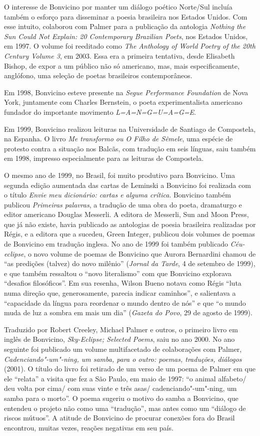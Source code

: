 O interesse de Bonvicino por manter um diálogo poético Norte/Sul incluía
também o esforço para disseminar a poesia brasileira nos Estados Unidos.
Com esse intuito, colaborou com Palmer para a publicação da antologia
\emph{Nothing the Sun Could Not Explain: 20 Contemporary Brazilian
Poets}, nos Estados Unidos, em 1997. O volume foi reeditado como
\emph{The  Anthology of World Poetry of the 20th Century Volume 3},
em 2003. Essa era a primeira tentativa, desde Elisabeth Bishop, de expor
a um público não só americano, mas, mais especificamente, anglófono, uma
seleção de poetas brasileiros contemporâneos.

Em 1998, Bonvicino esteve presente na \emph{Segue Performance
Foundation} de Nova York, juntamente com Charles Bernstein, o poeta
experimentalista americano fundador do importante movimento
\emph{L=A=N=G=U=A=G=E}.

Em 1999, Bonvicino realizou leituras na Universidade de Santiago de
Compostela, na Espanha. O livro \emph{Me transformo ou O Filho de
Sêmele}, uma espécie de protesto contra a situação nos Balcãs, com
tradução em seis línguas, saiu também em 1998, impresso especialmente
para as leituras de Compostela.

O mesmo ano de 1999, no Brasil, foi muito produtivo para Bonvicino. Uma
segunda edição aumentada das cartas de Leminski a Bonvicino foi
realizada com o título \emph{Envie meu dicionário: cartas e alguma
crítica}. Bonvicino também publicou \emph{Primeiras palavras}, a
tradução de uma obra do poeta, dramaturgo e editor americano Douglas
Messerli. A editora de Messerli, Sun and Moon Press, que já não existe,
havia publicado as antologias de poesia brasileira realizadas por Régis,
e a editora que a sucedeu, Green Integer, publicou dois volumes de
poemas de Bonvicino em tradução inglesa. No ano de 1999 foi também
publicado \emph{Céu-eclipse}, o novo volume de poemas de Bonvicino que
Aurora Bernardini chamou de ``as predições (talvez) do novo milênio''
(\emph{Jornal da Tarde}, 4 de setembro de 1999), e que também ressaltou
o ``novo literalismo'' com que Bonvicino explorava ``desafios
filosóficos''. Em sua resenha, Wilson Bueno notava como Régis ``luta
numa direção que, generosamente, parecia indicar caminhos'', e
salientava a ``capacidade da língua para reordenar o mundo dentro de
nós'' e que ``o mundo muda de luz a sombra em mais um dia''
(\emph{Gazeta do Povo}, 29 de agosto de 1999).

Traduzido por Robert Creeley, Michael Palmer e outros, o primeiro livro
em inglês de Bonvicino, \emph{Sky-Eclipse; Selected Poems}, saiu no ano
2000. No ano seguinte foi publicado um volume multifacetado de
colaborações com Palmer, \emph{Cadenciando"-um"-ning, um samba, para o
outro: poemas, traduções, diálogos} (2001). O título do livro foi
retirado de um verso de um poema de Palmer em que ele ``relata'' a
visita que fez a São Paulo, em maio de 1997: ``o animal alfabeto/ deu
volta por cima/ com suas vinte e três asas/ cadenciando"-um"-ning, um
samba para o morto''. O poema sugeriu o motivo do samba a Bonvicino, que
entendeu o projeto não como uma ``tradução'', mas antes como um
``diálogo de riscos mútuos''. A atitude de Bonvicino de procurar
conexões fora do Brasil encontrou, muitas vezes, reações negativas em
seu país.

